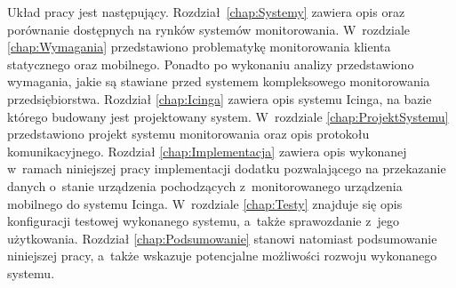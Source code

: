 Układ pracy jest następujący. Rozdział~\ref{chap:Systemy} zawiera opis
oraz porównanie dostępnych na rynków systemów
monitorowania. W~rozdziale \ref{chap:Wymagania} przedstawiono
problematykę monitorowania klienta statycznego oraz mobilnego. Ponadto
po wykonaniu analizy przedstawiono wymagania, jakie są stawiane przed
systemem kompleksowego monitorowania przedsiębiorstwa. Rozdział
\ref{chap:Icinga} zawiera opis systemu Icinga, na bazie którego
budowany jest projektowany system. W~rozdziale
\ref{chap:ProjektSystemu} przedstawiono projekt systemu monitorowania
oraz opis protokołu komunikacyjnego. Rozdział \ref{chap:Implementacja}
zawiera opis wykonanej w~ramach niniejszej pracy implementacji dodatku
pozwalającego na przekazanie danych o~stanie urządzenia pochodzących
z~monitorowanego urządzenia mobilnego do systemu Icinga. W~rozdziale
\ref{chap:Testy} znajduje się opis konfiguracji testowej wykonanego
systemu, a~także sprawozdanie z~jego użytkowania. Rozdział
\ref{chap:Podsumowanie} stanowi natomiast podsumowanie niniejszej
pracy, a~także wskazuje potencjalne możliwości rozwoju wykonanego
systemu.
